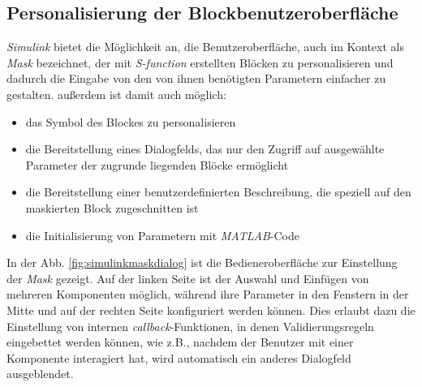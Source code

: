 \subsection{Personalisierung der Blockbenutzeroberfläche} \label{BenutzeroberflaecheSimulink}

\textit{Simulink} bietet die Möglichkeit an, die Benutzeroberfläche, auch im Kontext als \textit{Mask} bezeichnet, der mit \textit{S-function} erstellten Blöcken zu personalisieren und dadurch die Eingabe von den von ihnen benötigten Parametern einfacher zu gestalten. \cite{MaskingFundamentalsMATLAB} außerdem ist damit auch möglich:
\begin{itemize}
    \item das Symbol des Blockes zu personalisieren
    \item die Bereitstellung eines Dialogfelds, das nur den Zugriff auf ausgewählte Parameter der zugrunde liegenden Blöcke ermöglicht
    \item die Bereitstellung einer benutzerdefinierten Beschreibung, die speziell auf den maskierten Block zugeschnitten ist
    \item die Initialisierung von Parametern mit \textit{MATLAB}-Code
\end{itemize}

In der Abb. \ref{fig:simulinkmaskdialog} ist die Bedieneroberfläche zur Einstellung der \textit{Mask} gezeigt. Auf der linken Seite ist der Auswahl und Einfügen von mehreren Komponenten möglich, während ihre Parameter in den Fenstern in der Mitte und auf der rechten Seite konfiguriert werden können. Dies erlaubt dazu die Einstellung von internen \textit{callback}-Funktionen, in denen Validierungsregeln eingebettet werden können, wie z.B., nachdem der Benutzer mit einer Komponente interagiert hat, wird automatisch ein anderes Dialogfeld ausgeblendet. 


